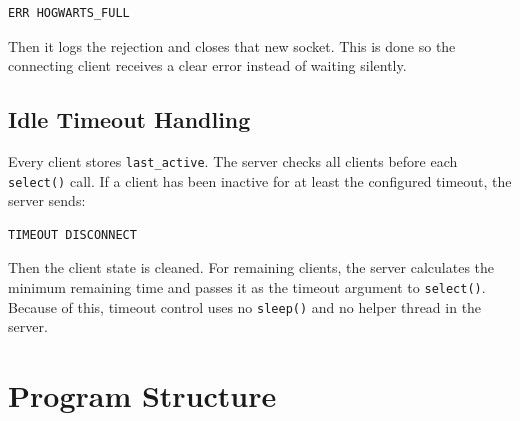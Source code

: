 \documentclass[11pt,a4paper]{article}
\begin{document}
\begin{lstlisting}
ERR HOGWARTS_FULL
\end{lstlisting}

Then it logs the rejection and closes that new socket. This is done so the connecting client receives
a clear error instead of waiting silently.

\subsection{Idle Timeout Handling}

Every client stores \texttt{last\_active}. The server checks all clients before each \texttt{select()}
call. If a client has been inactive for at least the configured timeout, the server sends:

\begin{lstlisting}
TIMEOUT DISCONNECT
\end{lstlisting}

Then the client state is cleaned. For remaining clients, the server calculates the minimum remaining
time and passes it as the timeout argument to \texttt{select()}. Because of this, timeout control uses
no \texttt{sleep()} and no helper thread in the server.

\section{Program Structure}
\end{document}
